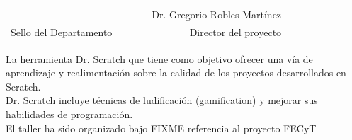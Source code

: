 \documentclass[12pt]{article}
\begin{document}
\begin{center}
\begin{table}[h]
\footnotesize
\begin{center}
\begin{tabular}{lp{1cm}cp{1cm}r}
\Large{ } & & 
\Large{  } & & 
\Large{Dr. Gregorio Robles Martínez} \\
Sello del Departamento & &
 & & 
Director del proyecto \\ 
\end{tabular}
\end{center}
\end{table}

\vspace{-0.5cm}

\scriptsize 
{La herramienta Dr. Scratch que tiene como objetivo ofrecer una vía de aprendizaje y realimentación sobre la calidad de los proyectos desarrollados en Scratch. \\ Dr. Scratch incluye técnicas de ludificación (gamification) y mejorar sus habilidades de programación. \\ 
El taller ha sido organizado bajo FIXME referencia al proyecto FECyT}

\end{center}
\end{document}
